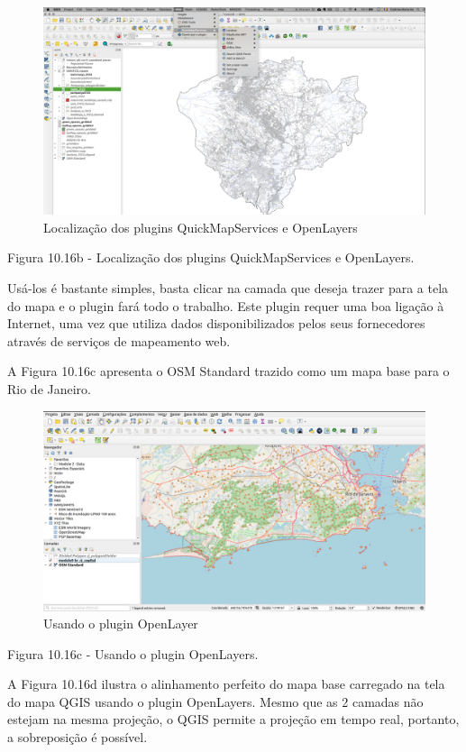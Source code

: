 \documentclass[
]{krantz}
\begin{document}
\begin{figure}
\centering
\includegraphics{media/modulo10/fig1016_b.png}
\caption{Localização dos plugins QuickMapServices e OpenLayers}
\end{figure}

Figura 10.16b - Localização dos plugins QuickMapServices e OpenLayers.

Usá-los é bastante simples, basta clicar na camada que deseja trazer para a tela do mapa e o plugin fará todo o trabalho. Este plugin requer uma boa ligação à Internet, uma vez que utiliza dados disponibilizados pelos seus fornecedores através de serviços de mapeamento web.

A Figura 10.16c apresenta o OSM Standard trazido como um mapa base para o Rio de Janeiro.

\begin{figure}
\centering
\includegraphics{media/modulo10/fig1016_c.png}
\caption{Usando o plugin OpenLayer}
\end{figure}

Figura 10.16c - Usando o plugin OpenLayers.

A Figura 10.16d ilustra o alinhamento perfeito do mapa base carregado na tela do mapa QGIS usando o plugin OpenLayers. Mesmo que as 2 camadas não estejam na mesma projeção, o QGIS permite a projeção em tempo real, portanto, a sobreposição é possível.
\end{document}
